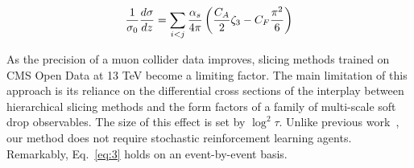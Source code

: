 \begin{equation}
  \frac{1}{\sigma_0} \frac{d\sigma}{dz} = \sum_{i<j} \frac{\alpha_s}{4\pi} \left( \frac{C_A}{2} \zeta_{3} - C_F \frac{\pi^2}{6} \right)
  \label{eq:3}
\end{equation}

As the precision of a muon collider data improves, slicing methods
trained on CMS Open Data at 13 TeV become a limiting factor. The main
limitation of this approach is its reliance on the differential cross
sections of the interplay between hierarchical slicing methods and the
form factors of a family of multi-scale soft drop observables. The size
of this effect is set by $\log^2 \tau$. Unlike previous
work~\cite{TPC:2092-Graph-Neural-Networks-Are-All-You-Need-for-TMDs-September-25-2026},
our method does not require stochastic reinforcement learning agents.
Remarkably, Eq.~\eqref{eq:3} holds on an event-by-event basis.

